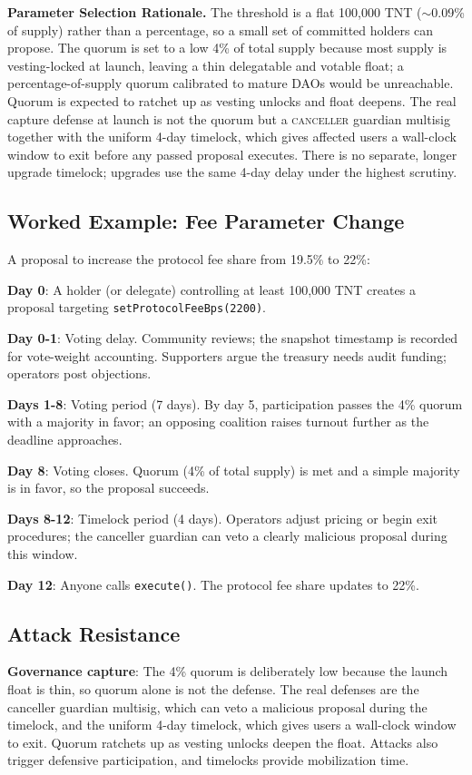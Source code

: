 \documentclass[11pt,a4paper]{article}
\begin{document}
\textbf{Parameter Selection Rationale.} The threshold is a flat 100{,}000 TNT ($\sim$0.09\% of supply) rather than a percentage, so a small set of committed holders can propose. The quorum is set to a low 4\% of total supply because most supply is vesting-locked at launch, leaving a thin delegatable and votable float; a percentage-of-supply quorum calibrated to mature DAOs would be unreachable. Quorum is expected to ratchet up as vesting unlocks and float deepens. The real capture defense at launch is not the quorum but a \textsc{canceller} guardian multisig together with the uniform 4-day timelock, which gives affected users a wall-clock window to exit before any passed proposal executes. There is no separate, longer upgrade timelock; upgrades use the same 4-day delay under the highest scrutiny.

\subsection{Worked Example: Fee Parameter Change}

A proposal to increase the protocol fee share from 19.5\% to 22\%:

\textbf{Day 0}: A holder (or delegate) controlling at least 100{,}000 TNT creates a proposal targeting \texttt{setProtocolFeeBps(2200)}.

\textbf{Day 0-1}: Voting delay. Community reviews; the snapshot timestamp is recorded for vote-weight accounting. Supporters argue the treasury needs audit funding; operators post objections.

\textbf{Days 1-8}: Voting period (7 days). By day 5, participation passes the 4\% quorum with a majority in favor; an opposing coalition raises turnout further as the deadline approaches.

\textbf{Day 8}: Voting closes. Quorum (4\% of total supply) is met and a simple majority is in favor, so the proposal succeeds.

\textbf{Days 8-12}: Timelock period (4 days). Operators adjust pricing or begin exit procedures; the canceller guardian can veto a clearly malicious proposal during this window.

\textbf{Day 12}: Anyone calls \texttt{execute()}. The protocol fee share updates to 22\%.

\subsection{Attack Resistance}

\textbf{Governance capture}: The 4\% quorum is deliberately low because the launch float is thin, so quorum alone is not the defense. The real defenses are the canceller guardian multisig, which can veto a malicious proposal during the timelock, and the uniform 4-day timelock, which gives users a wall-clock window to exit. Quorum ratchets up as vesting unlocks deepen the float. Attacks also trigger defensive participation, and timelocks provide mobilization time.
\end{document}
